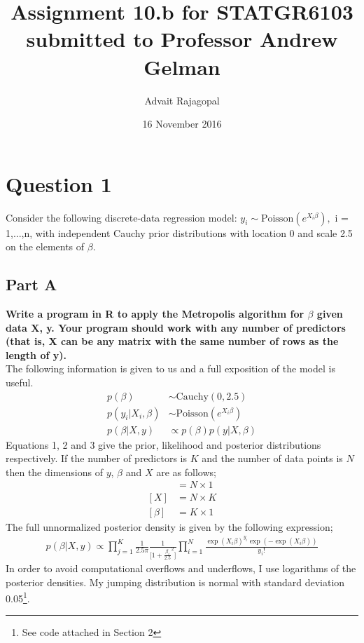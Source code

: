 \documentclass{article}
\title{Assignment 10.b for \textbf{STATGR6103}\\
\large submitted to Professor Andrew Gelman}
\date{16 November 2016}
\author{Advait Rajagopal}
\begin{document}
  \maketitle
\section{Question 1}
Consider the following discrete-data regression model: $y_i \sim \text{Poisson}(e^{X_i\beta}),$ i = 1,...,n, with independent Cauchy prior distributions with location 0 and scale 2.5 on the elements of $\beta$.

\subsection{Part A}
\textbf{Write a program in R to apply the Metropolis algorithm for $\beta$ given data X, y. Your program should work with any number of predictors (that is, X can be any matrix with the same number of rows as the length of y).}\\
The following information is given to us and a full exposition of the model is useful.
\begin{align}
p(\beta) &\sim \text{Cauchy}(0, 2.5)\\
p(y_i | X_i, \beta) &\sim \text{Poisson}(e^{X_i\beta})\\
p(\beta | X, y) &\propto p(\beta)p(y| X, \beta)
\end{align}
Equations 1, 2 and 3 give the prior, likelihood and posterior distributions respectively.
If the number of predictors is $K$ and the number of data points is $N$ then the dimensions of $y$, $\beta$ and $X$ are as follows;
\begin{align*}
[y] &= N \times 1\\
[X] & = N \times K\\
[\beta] &= K \times 1
\end{align*}
The full unnormalized posterior density is given by the following expression;
\begin{align*}
\displaystyle
p(\beta | X, y) \propto \prod_{j = 1}^{K} \frac{1}{2.5\pi} \frac{1}{\Big[ 1 + \frac{\beta_i}{2.5}^2 \Big]}\prod_{i=1}^{N}\frac{\exp(X_i\beta)^{y_i} \exp(-\exp(X_i \beta))}{y_i!}
\end{align*}
In order to avoid computational overflows and underflows, I use logarithms of the posterior densities. My jumping distribution is normal with standard deviation 0.05\footnote{See code attached in Section 2}.
\end{document}
